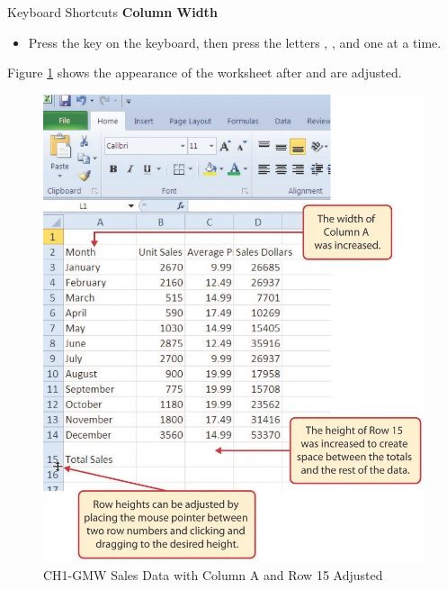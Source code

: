 \begin{center}
	\begin{shtcutbox}{Keyboard Shortcuts}
		\textbf{Column Width}
		\\
		\begin{itemize}
			\setlength{\itemsep}{0pt}
			\setlength{\parskip}{0pt}
			\setlength{\parsep}{0pt}
			
			\item Press the  key on the keyboard, then press the letters , , and  one at a time.
			
		\end{itemize}
	\end{shtcutbox}
\end{center}

Figure \ref{01:fig25} shows the appearance of the worksheet after  and  are adjusted.

\begin{figure}[H]
	\centering
	\includegraphics[width=\maxwidth{.95\linewidth}]{gfx/ch01_fig25}
	\caption{CH1-GMW Sales Data with Column A and Row 15 Adjusted}
	\label{01:fig25}
\end{figure}

